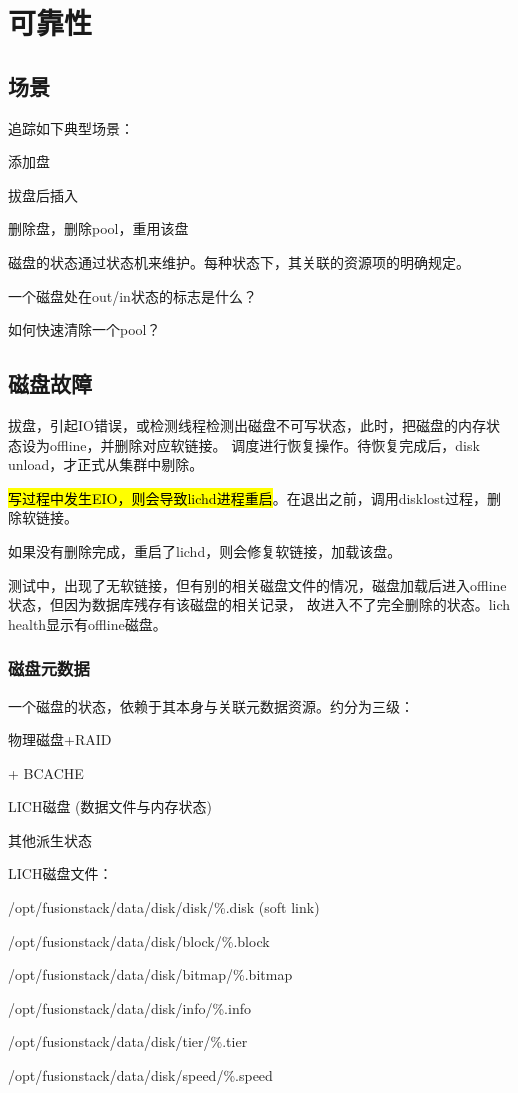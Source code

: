 \chapter{可靠性}

\section{场景}

追踪如下典型场景：
\begin{enumbox}
\item 添加盘
\item 拔盘后插入
\item 删除盘，删除pool，重用该盘
\end{enumbox}

磁盘的状态通过状态机来维护。每种状态下，其关联的资源项的明确规定。

一个磁盘处在out/in状态的标志是什么？

如何快速清除一个pool？

\section{磁盘故障}

拔盘，引起IO错误，或检测线程检测出磁盘不可写状态，此时，把磁盘的内存状态设为offline，并删除对应软链接。
调度进行恢复操作。待恢复完成后，disk unload，才正式从集群中剔除。

\hl{写过程中发生EIO，则会导致lichd进程重启}。在退出之前，调用disklost过程，删除软链接。

如果没有删除完成，重启了lichd，则会修复软链接，加载该盘。

测试中，出现了无软链接，但有别的相关磁盘文件的情况，磁盘加载后进入offline状态，但因为数据库残存有该磁盘的相关记录，
故进入不了完全删除的状态。lich health显示有offline磁盘。

\subsection{磁盘元数据}

一个磁盘的状态，依赖于其本身与关联元数据资源。约分为三级：
\begin{enumbox}
\item 物理磁盘+RAID
\item + BCACHE
\item LICH磁盘 (数据文件与内存状态)
\end{enumbox}

其他派生状态

LICH磁盘文件：
\begin{enumbox}
\item /opt/fusionstack/data/disk/disk/\%.disk (soft link)
\item /opt/fusionstack/data/disk/block/\%.block
\item /opt/fusionstack/data/disk/bitmap/\%.bitmap
\item /opt/fusionstack/data/disk/info/\%.info
\item /opt/fusionstack/data/disk/tier/\%.tier
\item /opt/fusionstack/data/disk/speed/\%.speed
\end{enumbox}

